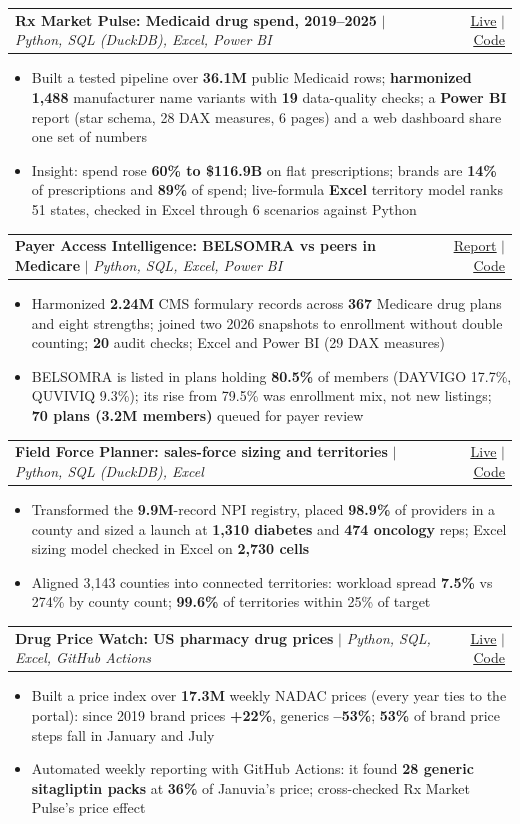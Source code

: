 \documentclass[letterpaper,10pt]{article}
\makeatletter
\newcommand{\resumeItem}[1]{
  \item\small{
    {#1 \vspace{-2pt}}
  }
}
\newcommand{\resumeProjectHeading}[2]{
    \item
    \begin{tabular*}{0.97\textwidth}{l@{\extracolsep{\fill}}r}
      \small#1 & #2 \\
    \end{tabular*}\vspace{-7pt}
}
\newcommand{\resumeItemListStart}{\begin{itemize}}
\newcommand{\resumeItemListEnd}{\end{itemize}\vspace{-5pt}}
\newcommand{\link}[2]{\href{#1}{\underline{#2}}}
\newcommand{\rxrepo}{https://github.com/f20230125-sudo/rx-market-pulse}
\newcommand{\rxlive}{https://rx-market-pulse.vercel.app}
\newcommand{\ffrepo}{https://github.com/f20230125-sudo/field-force-planner}
\newcommand{\fflive}{https://field-force-planner.vercel.app}
\newcommand{\pwrepo}{https://github.com/f20230125-sudo/drug-price-watch}
\newcommand{\pwlive}{https://drug-price-watch.vercel.app}
\newcommand{\parepo}{https://github.com/f20230125-sudo/payer-access-intelligence}
\makeatother
\begin{document}
    \resumeProjectHeading
      {\textbf{Rx Market Pulse: Medicaid drug spend, 2019--2025} $|$ \emph{Python, SQL (DuckDB), Excel, Power BI}}
      {\link{\rxlive}{Live} $|$ \link{\rxrepo}{Code}}
      \resumeItemListStart
        \resumeItem{Built a tested pipeline over \textbf{36.1M} public Medicaid rows; \textbf{harmonized 1,488} manufacturer name variants with \textbf{19} data-quality checks; a \textbf{Power BI} report (star schema, 28 DAX measures, 6 pages) and a web dashboard share one set of numbers}
        \resumeItem{Insight: spend rose \textbf{60\% to \$116.9B} on flat prescriptions; brands are \textbf{14\%} of prescriptions and \textbf{89\%} of spend; live-formula \textbf{Excel} territory model ranks 51 states, checked in Excel through 6 scenarios against Python}
      \resumeItemListEnd

    \resumeProjectHeading
      {\textbf{Payer Access Intelligence: BELSOMRA vs peers in Medicare} $|$ \emph{Python, SQL, Excel, Power BI}}
      {\link{\parepo/blob/main/outputs/Payer-Access-Analytical-Report.pdf}{Report} $|$ \link{\parepo}{Code}}
      \resumeItemListStart
        \resumeItem{Harmonized \textbf{2.24M} CMS formulary records across \textbf{367} Medicare drug plans and eight strengths; joined two 2026 snapshots to enrollment without double counting; \textbf{20} audit checks; Excel and Power BI (29 DAX measures)}
        \resumeItem{BELSOMRA is listed in plans holding \textbf{80.5\%} of members (DAYVIGO 17.7\%, QUVIVIQ 9.3\%); its rise from 79.5\% was enrollment mix, not new listings; \textbf{70 plans (3.2M members)} queued for payer review}
      \resumeItemListEnd

    \resumeProjectHeading
      {\textbf{Field Force Planner: sales-force sizing and territories} $|$ \emph{Python, SQL (DuckDB), Excel}}
      {\link{\fflive}{Live} $|$ \link{\ffrepo}{Code}}
      \resumeItemListStart
        \resumeItem{Transformed the \textbf{9.9M}-record NPI registry, placed \textbf{98.9\%} of providers in a county and sized a launch at \textbf{1,310 diabetes} and \textbf{474 oncology} reps; Excel sizing model checked in Excel on \textbf{2,730 cells}}
        \resumeItem{Aligned 3,143 counties into connected territories: workload spread \textbf{7.5\%} vs 274\% by county count; \textbf{99.6\%} of territories within 25\% of target}
      \resumeItemListEnd

    \resumeProjectHeading
      {\textbf{Drug Price Watch: US pharmacy drug prices} $|$ \emph{Python, SQL, Excel, GitHub Actions}}
      {\link{\pwlive}{Live} $|$ \link{\pwrepo}{Code}}
      \resumeItemListStart
        \resumeItem{Built a price index over \textbf{17.3M} weekly NADAC prices (every year ties to the portal): since 2019 brand prices \textbf{+22\%}, generics \textbf{--53\%}; \textbf{53\%} of brand price steps fall in January and July}
        \resumeItem{Automated weekly reporting with GitHub Actions: it found \textbf{28 generic sitagliptin packs} at \textbf{36\%} of Januvia's price; cross-checked Rx Market Pulse's price effect}
      \resumeItemListEnd
\end{document}

